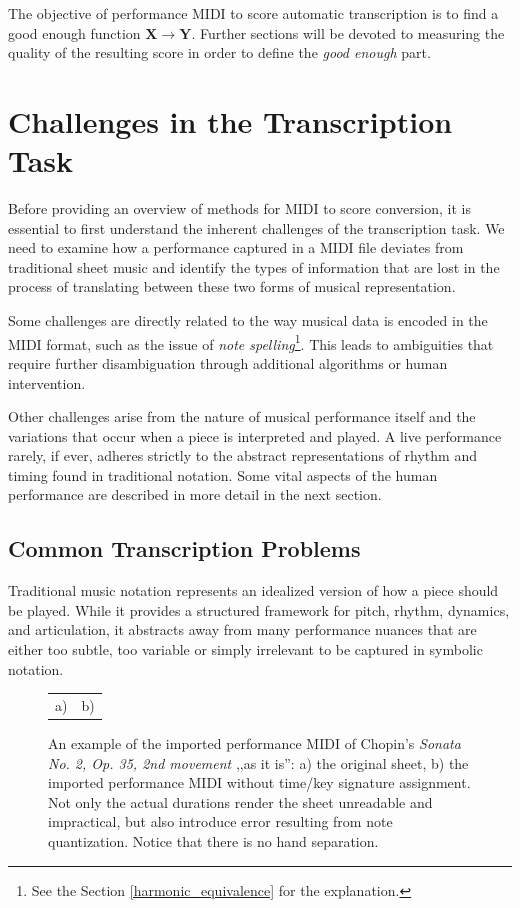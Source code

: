 The objective of performance MIDI to score automatic transcription is to find a good enough function $\mathbf{X}\to\mathbf{Y}$. Further sections will be devoted to measuring the quality of the resulting score in order to define the \emph{good enough} part. 

\section{Challenges in the Transcription Task}

Before providing an overview of methods for MIDI to score conversion, it is essential to first understand the inherent challenges of the transcription task. We need to examine how a performance captured in a MIDI file deviates from traditional sheet music and identify the types of information that are lost in the process of translating between these two forms of musical representation.

Some challenges are directly related to the way musical data is encoded in the MIDI format, such as the issue of \emph{note spelling}\footnote{See the Section \ref{harmonic_equivalence} for the explanation.}. This leads to ambiguities that require further disambiguation through additional algorithms or human intervention.

Other challenges arise from the nature of musical performance itself and the variations that occur when a piece is interpreted and played. A live performance rarely, if ever, adheres strictly to the abstract representations of rhythm and timing found in traditional notation. Some vital aspects of the human performance are described in more detail in the next section.

\subsection{Common Transcription Problems}

Traditional music notation represents an idealized version of how a piece should be played. While it provides a structured framework for pitch, rhythm, dynamics, and articulation, it abstracts away from many performance nuances that are either too subtle, too variable or simply irrelevant to be captured in symbolic notation.

\begin{figure}[ht!]
\centering
\begin{tabular}{cc}a)

 & b)
\end{tabular}
\caption[An example of the imported performance MIDI of Chopin's \emph{Sonata No. 2, Op. 35, 2nd movement} ,,as it is''.]{An example of the imported performance MIDI of Chopin's \emph{Sonata No. 2, Op. 35, 2nd movement} ,,as it is'': a) the original sheet, b) the imported performance MIDI without time/key signature assignment. Not only the actual durations render the sheet unreadable and impractical, but also introduce error resulting from note quantization. Notice that there is no hand separation.}
\label{chopin_sonata}
\end{figure}

